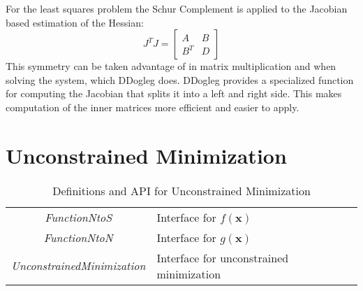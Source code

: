 \documentclass[peerreview,compsoc,onecolumn]{IEEEtran}
\begin{document}
For the least squares problem the Schur Complement is applied to the Jacobian based estimation of the Hessian:
\begin{equation}
J^T J =
\begin{bmatrix}
A & B \\
B^T & D
\end{bmatrix}
\end{equation}
This symmetry can be taken advantage of in matrix multiplication and when solving the system, which DDogleg does. DDogleg provides a specialized function for computing the Jacobian that splits it into a left and right side. This makes computation of the inner matrices more efficient and easier to apply.


\section{Unconstrained Minimization}

\begin{table}[h]
\centering
\caption{\label{definitions:UM}Definitions and API for Unconstrained Minimization}
\begin{tabular}{cl}
\textit{FunctionNtoS} & Interface for $f(\bm{x})$ \\
\textit{FunctionNtoN} & Interface for $g(\bm{x})$ \\
\textit{UnconstrainedMinimization} & Interface for unconstrained minimization
\end{tabular}
\end{table}
\end{document}
